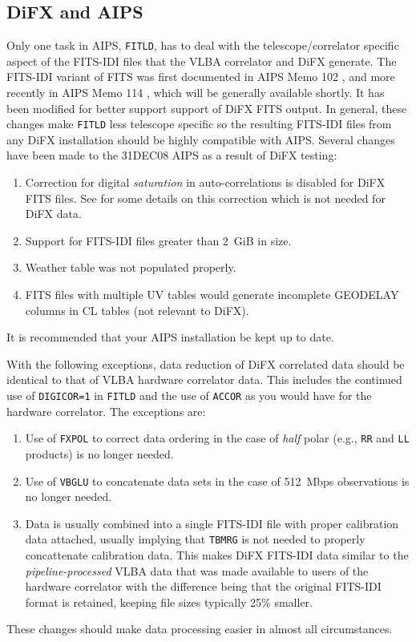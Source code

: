 \subsection{DiFX and AIPS}

Only one task in AIPS, {\tt FITLD}, has to deal with the telescope/correlator specific aspect of the FITS-IDI files that the VLBA correlator and DiFX generate.
The FITS-IDI variant of FITS was first documented in AIPS Memo 102 \cite{aips102}, and more recently in AIPS Memo 114 \cite{aips114}, which will be generally available shortly.
It has been modified for better support support of DiFX FITS output.
In general, these changes make {\tt FITLD} less telescope specific so the resulting FITS-IDI files from any DiFX installation should be highly compatible with AIPS.
Several changes have been made to the 31DEC08 AIPS as a result of DiFX testing:
\begin{enumerate}
\item Correction for digital {\it saturation} in auto-correlations is disabled for DiFX FITS files.  See \cite{sci12} for some details on this correction which is not needed for DiFX data.
\item Support for FITS-IDI files greater than 2~GiB in size.
\item Weather table was not populated properly.
\item FITS files with multiple UV tables would generate incomplete GEODELAY columns in CL tables (not relevant to DiFX).
\end{enumerate}
It is recommended that your AIPS installation be kept up to date.

With the following exceptions, data reduction of DiFX correlated data should be identical to that of VLBA hardware correlator data.
This includes the continued use of {\tt DIGICOR=1} in {\tt FITLD} and the use of {\tt ACCOR} as you would have for the hardware correlator.
The exceptions are:
\begin{enumerate}
\item Use of {\tt FXPOL} to correct data ordering in the case of {\em half} polar (e.g., {\tt RR} and {\tt LL} products) is no longer needed.
\item Use of {\tt VBGLU} to concatenate data sets in the case of 512~Mbps observations is no longer needed.
\item Data is usually combined into a single FITS-IDI file with proper calibration data attached, usually implying that {\tt TBMRG} is not needed to properly concattenate calibration data.  This makes DiFX FITS-IDI data similar to the {\em pipeline-processed} VLBA data that was made available to users of the hardware correlator with the difference being that the original FITS-IDI format is retained, keeping file sizes typically 25\% smaller. 
\end{enumerate}
These changes should make data processing easier in almost all circumstances.
